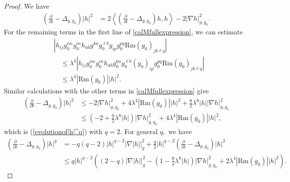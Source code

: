 \documentclass[12pt]{amsart}
\newcommand{\LA}{\left\langle}
\newcommand{\RA}{\right\rangle}
\newcommand{\p}{{ \partial}}
\renewcommand{\1}{{\mathbf 1}}
\newcommand{\Rm}{\mathrm{Rm}}
\renewcommand{\p}{{\partial}}
\theoremstyle{others}
\numberwithin{equation}{section}
\begin{document}
\begin{proof}
We have
   \begin{equation}
       \begin{split}
           \left( \frac{\p}{\p t} - \Delta_{g, g_0} \right) |h|^2 & = 2 \LA \left( \frac{\p}{\p t} - \Delta_{g, g_0} \right) h, h \RA - 2 |\nabla h|_{g,g_0}^2.
       \end{split}
   \end{equation}
   For the remaining terms in the first line of \eqref{calMfullexpression}, we can estimate
   \begin{equation*}
     \begin{split}
     & \left| h_{ij} g_0^{im} g_0^{in} h_{ab} g^{ka} g_0^{\ell b} g_{ip} g_0^{pq} \Rm(g_0)_{jk\ell q} \right| \\
     & \quad \leq \lambda^4 \left| h_{ij} g_0^{im} g_0^{in} h_{ab} g_0^{ka} g_0^{\ell b} (g_0)_{ip} g_0^{pq} \Rm(g_0)_{jk\ell q} \right| \\
     & \quad \leq \lambda^4 |\Rm(g_0)| |h|^2.
     \end{split}
     \end{equation*}
   Similar calculations with the other terms in \eqref{calMfullexpression} give
      \begin{equation}\label{evolutionof|h|^2}
       \begin{split}
           \left( \frac{\p}{\p t} - \Delta_{g, g_0} \right) |h|^2 & \leq - 2 |\nabla h|_{g,g_0}^2 + 4 \lambda^4 |\Rm(g_0)| |h|^2 + \frac{9}{2} \lambda^8 |h| |\nabla h|_{g,g_0}^2 \\
           & \leq \left( - 2 +  \frac{9}{2} \lambda^8 |h| \right) |\nabla h|_{g,g_0}^2 + 4 \lambda^4 |\Rm(g_0)| |h|^2,
       \end{split}
   \end{equation}
   which is (\ref{evolutionof|h|^q}) with $q = 2.$
For general $q,$ we have
      \begin{equation*}
       \begin{split}
           \left( \frac{\p}{\p t} - \Delta_{g, g_0} \right) |h|^q & = -q(q-2) |h|^{q-2}|\nabla |h||_{g}^2 + \frac{q}{2} |h|^{q-2} \left( \frac{\p}{\p t} - \Delta_{g,g_0} \right) |h|^2 \\
           & \leq q |h|^{q-2} \left( (2-q) | \nabla |h| |_g^2 - \left( 1 - \frac{9}{4} \lambda^8 |h| \right) |\nabla h|_{g,g_0}^2 + 2\lambda^4 |\Rm(g_0)| |h|^2 \right). %

\end{split}
\end{equation*}
\end{proof}
\end{document}
